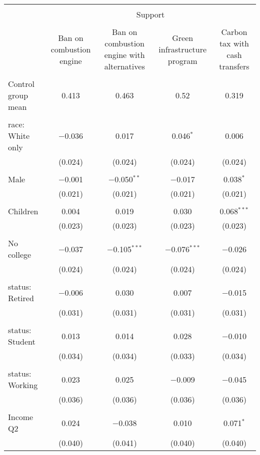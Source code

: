 
\begin{tabular}{@{\extracolsep{5pt}}lcccc} 
\\[-1.8ex]\hline 
\hline \\[-1.8ex] 
 & \multicolumn{4}{c}{Support} \\ 
\cline{2-5} 
\\[-1.8ex] & Ban on combustion engine & Ban on combustion engine with alternatives & Green infrastructure program & Carbon tax with cash transfers \\ 
\hline \\[-1.8ex] 
 Control group mean & 0.413 & 0.463 & 0.52 & 0.319  \\ \hline \\[-1.8ex] race: White only & $-$0.036 & 0.017 & 0.046$^{*}$ & 0.006 \\ 
  & (0.024) & (0.024) & (0.024) & (0.024) \\ 
  & & & & \\ 
 Male & $-$0.001 & $-$0.050$^{**}$ & $-$0.017 & 0.038$^{*}$ \\ 
  & (0.021) & (0.021) & (0.021) & (0.021) \\ 
  & & & & \\ 
 Children & 0.004 & 0.019 & 0.030 & 0.068$^{***}$ \\ 
  & (0.023) & (0.023) & (0.023) & (0.023) \\ 
  & & & & \\ 
 No college & $-$0.037 & $-$0.105$^{***}$ & $-$0.076$^{***}$ & $-$0.026 \\ 
  & (0.024) & (0.024) & (0.024) & (0.024) \\ 
  & & & & \\ 
 status: Retired & $-$0.006 & 0.030 & 0.007 & $-$0.015 \\ 
  & (0.031) & (0.031) & (0.031) & (0.031) \\ 
  & & & & \\ 
 status: Student & 0.013 & 0.014 & 0.028 & $-$0.010 \\ 
  & (0.034) & (0.034) & (0.033) & (0.034) \\ 
  & & & & \\ 
 status: Working & 0.023 & 0.025 & $-$0.009 & $-$0.045 \\ 
  & (0.036) & (0.036) & (0.036) & (0.036) \\ 
  & & & & \\ 
 Income Q2 & 0.024 & $-$0.038 & 0.010 & 0.071$^{*}$ \\ 
  & (0.040) & (0.041) & (0.040) & (0.040) \\ 

\end{tabular}
